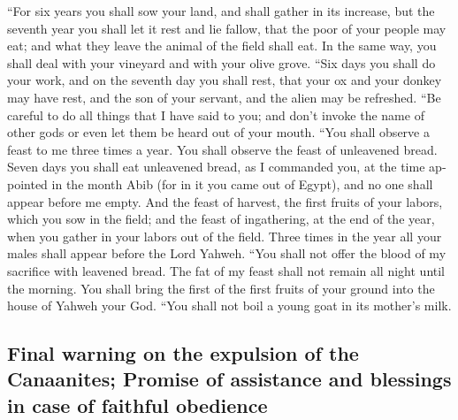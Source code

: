 \begin{paracol}{2}
\begin{otherlanguage}{english}
 ``For six years you shall sow your land, and shall
gather in its increase,  but the seventh year you shall
let it rest and lie fallow, that the poor of your people may eat; and
what they leave the animal of the field shall eat. In the same way, you
shall deal with your vineyard and with your olive grove. 
``Six days you shall do your work, and on the seventh day you shall
rest, that your ox and your donkey may have rest, and the son of your
servant, and the alien may be refreshed.  ``Be careful to
do all things that I have said to you; and don't invoke the name of
other gods or even let them be heard out of your mouth. 
``You shall observe a feast to me three times a year. 
You shall observe the feast of unleavened bread. Seven days you shall
eat unleavened bread, as I commanded you, at the time appointed in the
month Abib (for in it you came out of Egypt), and no one shall appear
before me empty.  And the feast of harvest, the first
fruits of your labors, which you sow in the field; and the feast of
ingathering, at the end of the year, when you gather in your labors out
of the field.  Three times in the year all your males
shall appear before the Lord Yahweh.  ``You shall not
offer the blood of my sacrifice with leavened bread. The fat of my feast
shall not remain all night until the morning.  You shall
bring the first of the first fruits of your ground into the house of
Yahweh your God. ``You shall not boil a young goat in its mother's milk.

\hypertarget{final-warning-on-the-expulsion-of-the-canaanites-promise-of-assistance-and-blessings-in-case-of-faithful-obedience}{%
\subsection{Final warning on the expulsion of the Canaanites; Promise of
assistance and blessings in case of faithful
obedience}\label{final-warning-on-the-expulsion-of-the-canaanites-promise-of-assistance-and-blessings-in-case-of-faithful-obedience}}


\end{otherlanguage}
\end{paracol}
